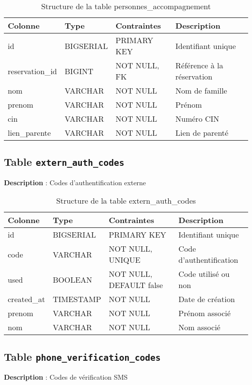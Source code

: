 \documentclass[12pt,a4paper]{article}
\begin{document}
\begin{table}[h]
\centering
\begin{tabular}{|l|l|l|p{6cm}|}
\hline
\textbf{Colonne} & \textbf{Type} & \textbf{Contraintes} & \textbf{Description} \\
\hline
id & BIGSERIAL & PRIMARY KEY & Identifiant unique \\
\hline
reservation\_id & BIGINT & NOT NULL, FK & Référence à la réservation \\
\hline
nom & VARCHAR & NOT NULL & Nom de famille \\
\hline
prenom & VARCHAR & NOT NULL & Prénom \\
\hline
cin & VARCHAR & NOT NULL & Numéro CIN \\
\hline
lien\_parente & VARCHAR & NOT NULL & Lien de parenté \\
\hline
\end{tabular}
\caption{Structure de la table personnes\_accompagnement}
\end{table}

\subsection{Table \texttt{extern\_auth\_codes}}
\textbf{Description} : Codes d'authentification externe

\begin{table}[h]
\centering
\begin{tabular}{|l|l|l|p{6cm}|}
\hline
\textbf{Colonne} & \textbf{Type} & \textbf{Contraintes} & \textbf{Description} \\
\hline
id & BIGSERIAL & PRIMARY KEY & Identifiant unique \\
\hline
code & VARCHAR & NOT NULL, UNIQUE & Code d'authentification \\
\hline
used & BOOLEAN & NOT NULL, DEFAULT false & Code utilisé ou non \\
\hline
created\_at & TIMESTAMP & NOT NULL & Date de création \\
\hline
prenom & VARCHAR & NOT NULL & Prénom associé \\
\hline
nom & VARCHAR & NOT NULL & Nom associé \\
\hline
\end{tabular}
\caption{Structure de la table extern\_auth\_codes}
\end{table}

\subsection{Table \texttt{phone\_verification\_codes}}
\textbf{Description} : Codes de vérification SMS
\end{document}
